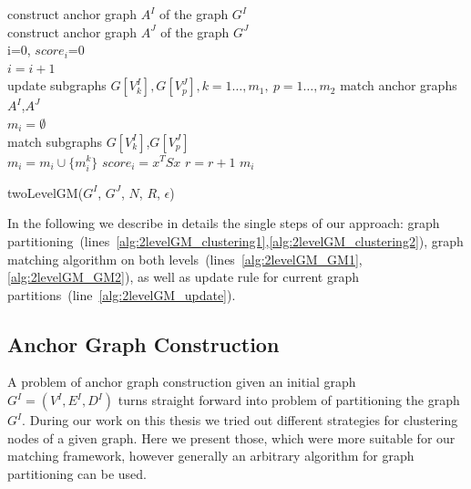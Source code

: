 \begin{algorithm}[h]
	construct anchor graph $A^I$ of the graph $G^I$ \label{alg:2levelGM_clustering1}\\
	construct anchor graph $A^J$ of the graph $G^J$ \label{alg:2levelGM_clustering2}\\
	i=0, $score_i$=0\\
	{ $i=i+1$ \\
	  {update subgraphs $G[V^I_k],G[V^J_p],k=1\dots,m_1,\ p=1\dots,m_2$ \label{alg:2levelGM_update}}
	  match anchor graphs $A^I$,$A^J$ \label{alg:2levelGM_GM1} \\
	  $m_i=\emptyset$\\
	  {match subgraphs $G[V^I_k]$,$G[V^J_p]$ \label{alg:2levelGM_GM2}\\
	   $m_i=m_i\cup\{m^k_i\}$\hspace{55pt}
	  }
	  $score_i=x^TSx$ \hspace{5pt}
	  {$r=r+1$}
	}
	\Return $m_i$
	\caption{twoLevelGM($G^I$, $G^J$, $N$, $R$, $\epsilon$)} \label{alg:2levelGM}
\end{algorithm}

In the following we describe in details the single steps of our approach: %
graph partitioning~(lines~\ref{alg:2levelGM_clustering1},\ref{alg:2levelGM_clustering2}), graph matching algorithm on both levels~(lines~\ref{alg:2levelGM_GM1},\ref{alg:2levelGM_GM2}), as well as update rule for current graph partitions~(line~\ref{alg:2levelGM_update}).
\subsection{Anchor Graph Construction}
A problem of anchor graph construction given an initial graph $G^I=(V^I,E^I,D^I)$ turns straight forward into problem of partitioning the graph $G^I$. During our work on this thesis we tried out different strategies for clustering nodes of a given graph. Here we present those, which were more suitable for our matching framework, however generally an arbitrary algorithm for graph partitioning can be used.


